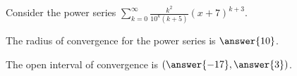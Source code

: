 \documentclass{ximera}
\author{Jim Talamo}
\begin{document}
\begin{exercise}
Consider the power series $\sum_{k=0}^{\infty} \frac{k^2 }{10^k (k+5)}(x+7)^{k+3}$.

The radius of convergence for the power series is $\answer{10}$.

The open interval of convergence is $\left(\answer{-17},\answer{3}\right)$.

\end{exercise}
\end{document}
